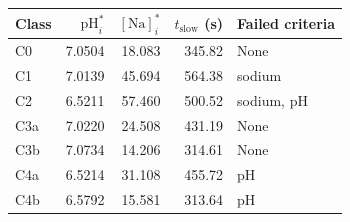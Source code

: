 \begin{tabular}{lrrrl}
\toprule
Class & $\mathrm{pH}_i^*$ & $[\mathrm{Na}]_i^*$ & $t_{\mathrm{slow}}$ (s) & Failed criteria \\
\midrule
C0 & 7.0504 & 18.083 & 345.82 & None \\
C1 & 7.0139 & 45.694 & 564.38 & sodium \\
C2 & 6.5211 & 57.460 & 500.52 & sodium, pH \\
C3a & 7.0220 & 24.508 & 431.19 & None \\
C3b & 7.0734 & 14.206 & 314.61 & None \\
C4a & 6.5214 & 31.108 & 455.72 & pH \\
C4b & 6.5792 & 15.581 & 313.64 & pH \\
\bottomrule
\end{tabular}
